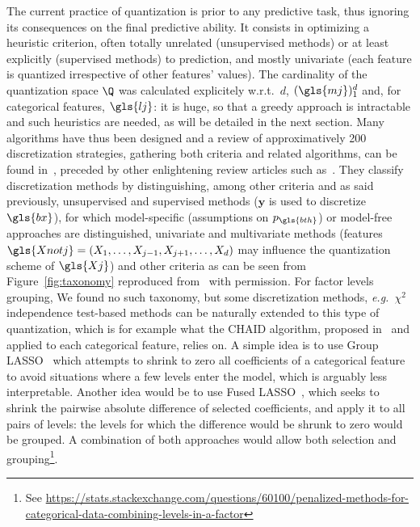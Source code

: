The current practice of quantization is prior to any predictive task, thus ignoring its consequences on the final predictive ability. It consists in optimizing a heuristic criterion, often totally unrelated (unsupervised methods) or at least explicitly (supervised methods) to prediction, and mostly univariate (each feature is quantized irrespective of other features' values). The cardinality of the quantization space $\Q$ was calculated explicitely w.r.t.\ $d$, $(\gls{mj})_1^d$ and, for categorical features, $\gls{lj}$: it is huge, so that a greedy approach is intractable and such heuristics are needed, as will be detailed in the next section.
Many algorithms have thus been designed and a review of approximatively 200 discretization strategies, gathering both criteria and related algorithms, can be found in~\cite{ramirez2016data}, preceded by other enlightening review articles such as~\cite{dougherty1995supervised,liu2002discretization}. They classify discretization methods by distinguishing, among other criteria and as said previously, unsupervised and supervised methods ($\bm{y}$ is used to discretize $\gls{bx}$), for which model-specific (assumptions on $p_{\gls{bth}}$) or model-free approaches are distinguished, univariate and multivariate methods (features $\gls{Xnotj} = (X_{1},\ldots,X_{j-1},X_{j+1},\ldots,X_{d})$ may influence the quantization scheme of $\gls{Xj}$) and other criteria as can be seen from Figure~\ref{fig:taxonomy} reproduced from~\cite{ramirez2016data} with permission. For factor levels grouping, We found no such taxonomy, but some discretization methods, \textit{e.g.}\ $\chi^2$ independence test-based methods can be naturally extended to this type of quantization, which is for example what the CHAID algorithm, proposed in~\cite{kass1980exploratory} and applied to each categorical feature, relies on. A simple idea is to use Group LASSO~\cite{meier2008group} which attempts to shrink to zero all coefficients of a categorical feature to avoid situations where a few levels enter the model, which is arguably less interpretable. Another idea would be to use Fused LASSO~\cite{tibshirani2005sparsity}, which seeks to shrink the pairwise absolute difference of selected coefficients, and apply it to all pairs of levels: the levels for which the difference would be shrunk to zero would be grouped. A combination of both approaches would allow both selection and grouping\footnote{See \url{https://stats.stackexchange.com/questions/60100/penalized-methods-for-categorical-data-combining-levels-in-a-factor}}.
